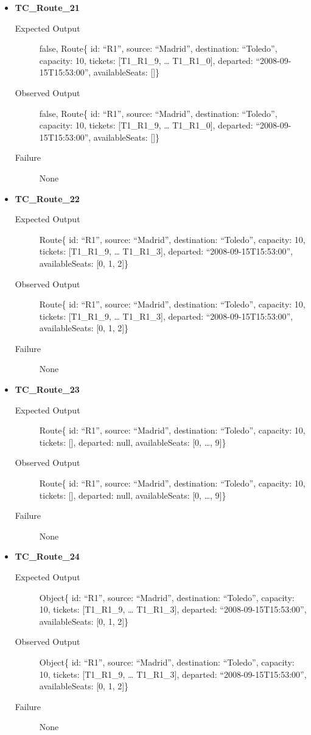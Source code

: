 \documentclass[11pt]{article}
\begin{document}
\begin{itemize}
\item \textbf{TC\_Route\_21}
\begin{description}
\item[{Expected Output}] false, Route\{ id: “R1”, source: “Madrid”, destination: “Toledo”, capacity: 10,  tickets: [T1\_R1\_9, … T1\_R1\_0], departed: “2008-09-15T15:53:00”, availableSeats: []\}
\item[{Observed Output}] false, Route\{ id: “R1”, source: “Madrid”, destination: “Toledo”, capacity: 10,  tickets: [T1\_R1\_9, … T1\_R1\_0], departed: “2008-09-15T15:53:00”, availableSeats: []\}
\item[{Failure}] None
\end{description}

\item \textbf{TC\_Route\_22}
\begin{description}
\item[{Expected Output}] Route\{ id: “R1”, source: “Madrid”, destination: “Toledo”, capacity: 10,  tickets: [T1\_R1\_9, … T1\_R1\_3], departed: “2008-09-15T15:53:00”, availableSeats: [0, 1, 2]\}
\item[{Observed Output}] Route\{ id: “R1”, source: “Madrid”, destination: “Toledo”, capacity: 10,  tickets: [T1\_R1\_9, … T1\_R1\_3], departed: “2008-09-15T15:53:00”, availableSeats: [0, 1, 2]\}
\item[{Failure}] None
\end{description}

\item \textbf{TC\_Route\_23}
\begin{description}
\item[{Expected Output}] Route\{ id: “R1”, source: “Madrid”, destination: “Toledo”, capacity: 10,  tickets: [], departed: null, availableSeats: [0, …, 9]\}
\item[{Observed Output}] Route\{ id: “R1”, source: “Madrid”, destination: “Toledo”, capacity: 10,  tickets: [], departed: null, availableSeats: [0, …, 9]\}
\item[{Failure}] None
\end{description}

\item \textbf{TC\_Route\_24}
\begin{description}
\item[{Expected Output}] Object\{ id: “R1”, source: “Madrid”, destination: “Toledo”, capacity: 10,  tickets: [T1\_R1\_9, … T1\_R1\_3], departed: “2008-09-15T15:53:00”, availableSeats: [0, 1, 2]\}
\item[{Observed Output}] Object\{ id: “R1”, source: “Madrid”, destination: “Toledo”, capacity: 10,  tickets: [T1\_R1\_9, … T1\_R1\_3], departed: “2008-09-15T15:53:00”, availableSeats: [0, 1, 2]\}
\item[{Failure}] None
\end{description}


\end{itemize}
\end{document}
